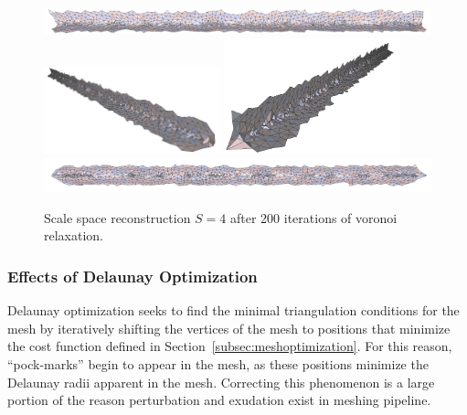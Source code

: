\documentclass[12pt]{drexelthesis}
\let\Oldsubsubsection\subsubsection
\renewcommand{\subsubsection}{\FloatBarrier\Oldsubsubsection}
\begin{document}
\begin{figure}[!ht]
	\centering
		\includegraphics[width=5in]{simulated-lab-scan/0noise/optimizedNeat/scalespace4lloyd00.png}
		\includegraphics[width=2in]{simulated-lab-scan/0noise/optimizedNeat/scalespace4lloyd01.png}
		\includegraphics[width=2in]{simulated-lab-scan/0noise/optimizedNeat/scalespace4lloyd02.png}
		\includegraphics[width=5in]{simulated-lab-scan/0noise/optimizedNeat/scalespace4lloyd03.png}
		\caption[Scale space reconstruction $S = 4$ after 200 iterations of voronoi relaxation]{\centering Scale space reconstruction $S = 4$ after 200 iterations of voronoi relaxation.}
	\label{zeronoise:scalespace4lloyd}
\end{figure}


\subsubsection{Effects of Delaunay Optimization}

Delaunay optimization seeks to find the minimal triangulation conditions for the mesh by iteratively shifting the vertices of the mesh to positions that minimize the cost function defined in Section~\ref{subsec:meshoptimization}. For this reason, ``pock-marks'' begin to appear in the mesh, as these positions minimize the Delaunay radii apparent in the mesh. Correcting this phenomenon is a large portion of the reason perturbation and exudation exist in meshing pipeline.
\end{document}
